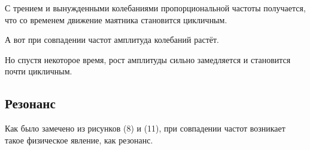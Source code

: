 			С трением и вынужденными колебаниями пропорциональной частоты получается, что со временем движение маятника становится цикличным.


			А вот при совпадении частот амплитуда колебаний растёт.


			Но спустя некоторое время, рост амплитуды сильно замедляется и становится почти цикличным.


		\subsection{Резонанс}
			Как было замечено из рисунков (8) и (11), при совпадении частот возникает такое физическое явление, как резонанс. 


			


\pagebreak